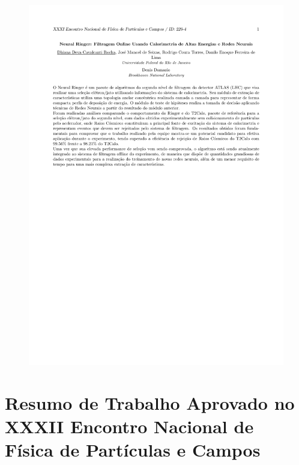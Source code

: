 \documentclass[a4paper,10pt,titlepage]{article}
\begin{document}
\begin{figure}[hb]
 \includegraphics[scale=0.8,keepaspectratio=true,clip=true,trim=55px 300px 50px 50px]{Figs/abstracts/enfpc_xxxi/R0220-4.pdf}
\end{figure}

\clearpage

\section{Resumo de Trabalho Aprovado no XXXII Encontro Nacional de Física de Partículas e Campos}
\end{document}
